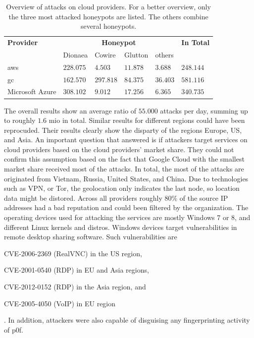 \begin{table}
    \centering
    \caption[Overview of attacks on cloud providers]{Overview of attacks on cloud providers. For a better overview, only the three most attacked honeypots are listed. The others combine several honeypots.}
    \begin{tabular}{l|llll|l}
        \toprule
        \textbf{Provider} & \multicolumn{4}{c|}{\textbf{Honeypot}} & \textbf{In Total}                                   \\
                          & Dionaea                                & Cowire            & Glutton  & others   &           \\
        \hline
        \acl{aws}         & $228.075$                              & $4.503$           & $11.878$ & $3.688$  & $248.144$ \\
        \acl{gc}          & $162.570$                              & $297.818$         & $84.375$ & $36.403$ & $581.116$ \\
        Microsoft Azure   & $308.102$                              & $9.012$           & $17.256$ & $6.365$  & $340.735$ \\
        \bottomrule
    \end{tabular}
    \label{tab:overview-cloud-security}
\end{table}

The overall results show an average ratio of $55.000$ attacks per day, summing up to roughly $1.6$ mio in total.
Similar results for different regions could have been reprocuded.
Their results clearly show the disparty of the regions Europe, US, and Asia.
An important question that \citet{Kelly2021} answered is if attackers target services on cloud providers based on the cloud providers' market share.
They could not confirm this assumption based on the fact that Google Cloud with the smallest market share received most of the attacks.
In total, the most of the attacks are originated from Vietnam, Russia, United States, and China.
Due to technologies such as VPN, or Tor, the geolocation only indicates the last node, so location data might be distored.
Across all providers roughly $80\%$ of the source IP addresses had a bad reputation and could been filtered by the organization.
The operating devices used for attacking the services are mostly Windows 7 or 8, and different Linux kernels and distros.
Windows devices target vulnerabilities in remote desktop sharing software. Such vulnerabilities are
\begin{enumerate*}[label=(\roman*)]
    \item CVE-2006-2369\cite{CVE-2006-2369} (RealVNC) in the US region,
    \item CVE-2001-0540\cite{CVE-2001-0540} (RDP) in EU and Asia regions,
    \item CVE-2012-0152\cite{CVE-2012-0152} (RDP) in the Asia region, and
    \item CVE-2005-4050\cite{CVE-2005-4050} (VoIP) in EU region
\end{enumerate*}.
In addition, attackers were also capable of disguising any fingerprinting activity of p0f.


